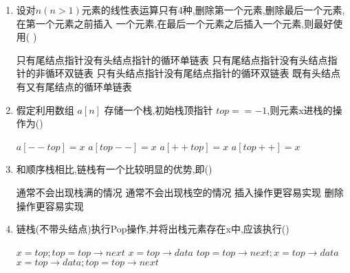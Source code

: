 \documentclass[12pt, a4paper, oneside, UTF8]{ctexbook}
\begin{document}
\begin{enumerate}
    \item 设对$n(n>1)$元素的线性表运算只有4种,删除第一个元素,删除最后一个元素,在第一个元素之前插入
    一个元素,在最后一个元素之后插入一个元素,则最好使用(    ) 
    \begin{choices}[1]
        \task 只有尾结点指针没有头结点指针的循环单链表
        \task 只有尾结点指针没有头结点指针的非循环双链表
        \task 只有头结点指针没有尾结点指针的循环双链表
        \task 既有头结点有又有尾结点的循环单链表
    \end{choices}

    \item 假定利用数组 $a[n]$ 存储一个栈,初始栈顶指针 $top==-1$,则元素x进栈的操作为() 
    \begin{choices}
        \task $a[--top] = x$ 
        \task $a[top--] = x$
        \task $a[++top] = x$
        \task $a[top++] = x$
    \end{choices}

    \item 和顺序栈相比,链栈有一个比较明显的优势,即() 
    \begin{choices}[2]
        \task 通常不会出现栈满的情况 
        \task 通常不会出现栈空的情况 
        \task 插入操作更容易实现 
        \task 删除操作更容易实现 
    \end{choices}

    \item 链栈(不带头结点)执行Pop操作,并将出栈元素存在x中,应该执行() 
    \begin{choices}[2]
        \task $x=top;top=top\rightarrow next$ 
        \task $x=top\rightarrow data$ 
        \task $top=top\rightarrow next;x=top\rightarrow data$
        \task $x=top\rightarrow data;top=top\rightarrow next$ 
    \end{choices}


\end{enumerate}
\end{document}

